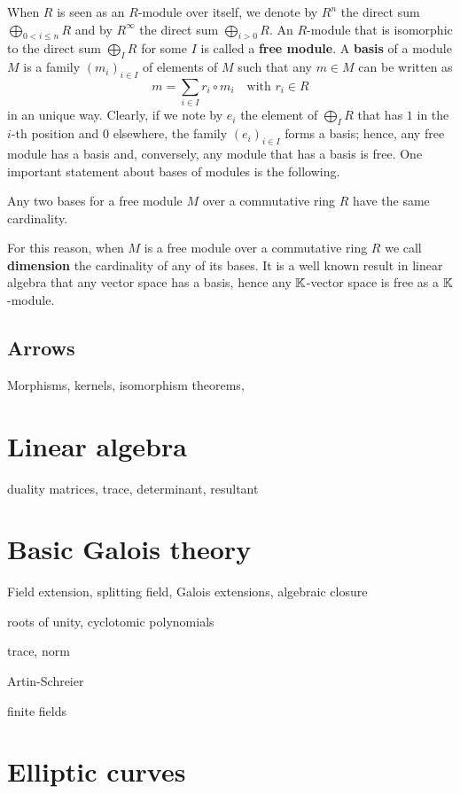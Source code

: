 When $R$ is seen as an $R$-module over itself, we denote by $R^n$ the
direct sum $\bigoplus_{0<i\le n}R$ and by $R^\infty$ the direct sum
$\bigoplus_{i>0}R$. An $R$-module that is isomorphic to the direct sum
$\bigoplus_{I}R$ for some $I$ is called a
\textbf{free module}. A \textbf{basis}
of a module $M$ is a family $(m_i)_{i\in I}$ of elements of $M$ such
that any $m\in M$ can be written as 
\begin{equation}
  \label{eq:module-basis}
  m = \sum_{i\in I} r_i\circ m_i
  \quad\text{with $r_i\in R$}
\end{equation}
in an unique way. Clearly, if we note by $e_i$ the element of
$\bigoplus_IR$ that has $1$ in the $i$-th position and $0$ elsewhere,
the family $(e_i)_{i\in I}$ forms a basis; hence, any free module has
a basis and, conversely, any module that has a basis is free. One
important statement about bases of modules is the following.

\begin{proposition}
  Any two bases for a free module $M$ over a commutative ring $R$ have
  the same cardinality.
\end{proposition}

For this reason, when $M$ is a free module over a commutative ring $R$
we call  
\textbf{dimension} the cardinality of
any of its bases. It is a well known result in linear algebra that any
vector space has a basis, hence any $\mathbb{K}$-vector space is free as a
$\mathbb{K}$-module.


\subsection{Arrows}
\label{sec:ring-fields:arrows}

Morphisms, kernels, isomorphism theorems, 

\section{Linear algebra}
\label{sec:linear-algebra}

duality
matrices, trace, determinant, resultant

\section{Basic Galois theory}
\label{sec:basic-galois-theory}
Field extension, splitting field, Galois extensions, algebraic closure

roots of unity, cyclotomic polynomials

trace, norm

Artin-Schreier

finite fields


\section{Elliptic curves}
\label{sec:elliptic-curves}





